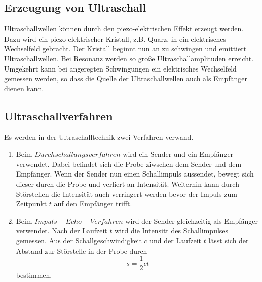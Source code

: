 \subsection{Erzeugung von Ultraschall}
\label{sec:Ultraschall}
Ultraschallwellen können durch den piezo-elektrischen Effekt erzeugt werden. Dazu wird ein piezo-elektrischer
Kristall, z.B. Quarz, in ein elektrisches Wechselfeld gebracht. Der Kristall beginnt nun an zu schwingen und
emittiert Ultraschallwellen. Bei Resonanz werden so große Ultraschallamplituden erreicht.
Umgekehrt kann bei angeregten Schwingungen ein elektrisches Wechselfeld gemessen werden, so dass die Quelle
der Ultraschallwellen auch als Empfänger dienen kann.

\subsection{Ultraschallverfahren}
\label{sec:Ultraschallverfahren}
Es werden in der Ultraschalltechnik zwei Verfahren verwand.
\begin{enumerate}
    \item Beim $Durchschallungsverfahren$ wird ein Sender und ein Empfänger verwendet. Dabei befindet sich die
    Probe ziwschen dem Sender und dem Empfänger. Wenn der Sender nun einen Schallimpuls aussendet, bewegt sich
    dieser durch die Probe und verliert an Intensität. Weiterhin kann durch Störstellen die Intensität auch
    verringert werden bevor der Impuls zum Zeitpunkt $t$ auf den Empfänger trifft.
    \item Beim $Impuls-Echo-Verfahren$ wird der Sender gleichzeitig als Empfänger verwendet. Nach der Laufzeit
    $t$ wird die Intensitt des Schallimpulses gemessen. Aus der Schallgeschwindigkeit $c$ und der Laufzeit $t$
    lässt sich der Abstand zur Störstelle in der Probe durch
    \begin{equation}
        \label{eqn:Strecke}
        s = \frac{1}{2}ct
    \end{equation}
    bestimmen.
\end{enumerate}